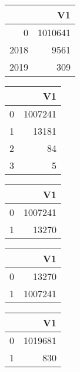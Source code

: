 \bigskip\bigskip
\centering
\begin{tabular}{rr}
  \hline
 & V1 \\ 
  \hline
0 & 1010641 \\ 
  2018 & 9561 \\ 
  2019 & 309 \\ 
   \hline
\end{tabular}

\bigskip\bigskip
\centering
\begin{tabular}{rr}
  \hline
 & V1 \\ 
  \hline
0 & 1007241 \\ 
  1 & 13181 \\ 
  2 &  84 \\ 
  3 &   5 \\ 
   \hline
\end{tabular}

\bigskip\bigskip
\centering
\begin{tabular}{rr}
  \hline
 & V1 \\ 
  \hline
0 & 1007241 \\ 
  1 & 13270 \\ 
   \hline
\end{tabular}

\bigskip\bigskip
\centering
\begin{tabular}{rr}
  \hline
 & V1 \\ 
  \hline
0 & 13270 \\ 
  1 & 1007241 \\ 
   \hline
\end{tabular}

\bigskip\bigskip
\centering
\begin{tabular}{rr}
  \hline
 & V1 \\ 
  \hline
0 & 1019681 \\ 
  1 & 830 \\ 
   \hline
\end{tabular}

